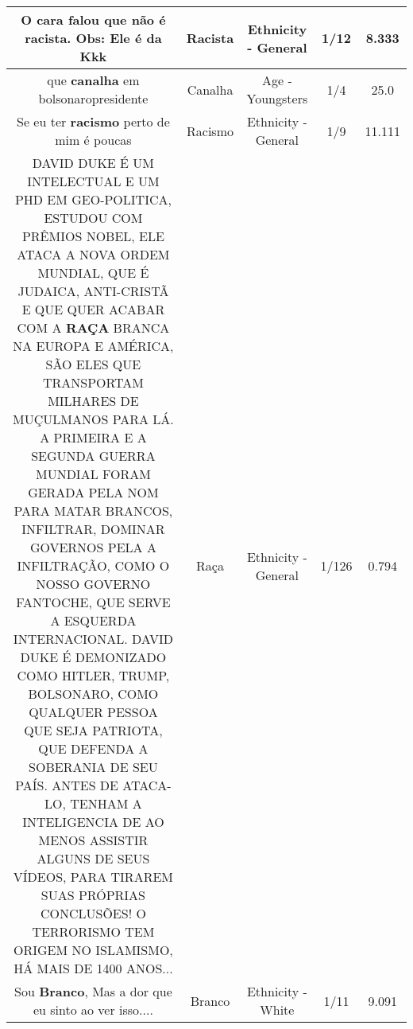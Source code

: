 \documentclass[11pt]{article}
\newlength\mylength
\begin{document}
\begin{center}
\begin{longtable}{|C{.65\mylength}|C{.30\mylength}|C{.12\mylength}|C{.12\mylength}|C{.12\mylength}|}
  \small O cara falou que não é \textbf{racista}. Obs: Ele é da Kkk\normalsize   & Racista & Ethnicity - General & 1/12 & 8.333 \\  \hline
  \small que \textbf{canalha} em bolsonaropresidente\normalsize   & Canalha & Age - Youngsters & 1/4 & 25.0 \\  \hline
  \small Se eu ter \textbf{racismo} perto de mim é poucas\normalsize   & Racismo & Ethnicity - General & 1/9 & 11.111 \\  \hline
  \small DAVID DUKE É UM INTELECTUAL E UM PHD EM GEO-POLITICA, ESTUDOU COM PRÊMIOS NOBEL, ELE ATACA A NOVA ORDEM MUNDIAL, QUE É JUDAICA, ANTI-CRISTÃ E QUE QUER ACABAR COM A \textbf{RAÇA} BRANCA NA EUROPA E AMÉRICA, SÃO ELES QUE TRANSPORTAM MILHARES DE MUÇULMANOS PARA LÁ.   A PRIMEIRA E A SEGUNDA GUERRA MUNDIAL FORAM GERADA PELA NOM PARA MATAR BRANCOS, INFILTRAR, DOMINAR GOVERNOS PELA A INFILTRAÇÃO, COMO O NOSSO GOVERNO FANTOCHE, QUE SERVE A ESQUERDA INTERNACIONAL.    DAVID DUKE É DEMONIZADO COMO HITLER, TRUMP, BOLSONARO, COMO QUALQUER PESSOA QUE SEJA PATRIOTA, QUE DEFENDA A SOBERANIA DE SEU PAÍS.   ANTES DE ATACA-LO, TENHAM A INTELIGENCIA DE AO MENOS ASSISTIR ALGUNS DE SEUS VÍDEOS, PARA TIRAREM SUAS PRÓPRIAS CONCLUSÕES!      O TERRORISMO TEM ORIGEM NO ISLAMISMO, HÁ MAIS DE 1400 ANOS...\normalsize   & Raça & Ethnicity - General & 1/126 & 0.794 \\  \hline
  \small Sou \textbf{Branco}, Mas a dor que eu sinto ao ver isso....\normalsize   & Branco & Ethnicity - White & 1/11 & 9.091 \\  \hline

\end{longtable}
\end{center}
\end{document}
